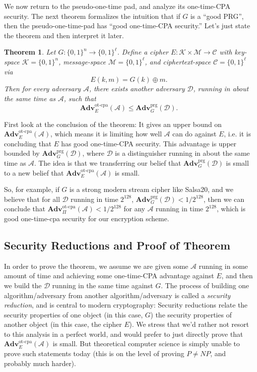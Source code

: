 \documentclass[11pt]{article}
\newtheorem{theorem}{Theorem}
\newcommand{\msgs}{\mathcal{M}}
\newcommand{\ctxts}{\mathcal{C}}
\newcommand{\keys}{\mathcal{K}}
\newcommand{\calD}{\mathcal{D}}
\newcommand{\calA}{\mathcal{A}}
\newcommand{\Adv}{\mathbf{Adv}}
\newcommand{\AdvPRG}[2]{\Adv^{\mathrm{prg}}_{#1}({#2})}
\newcommand{\bits}{\{0,1\}}
\newcommand{\AdvOTCPA}[2]{\Adv^{\mathrm{ot\mbox{-}cpa}}_{#1}({#2})}
\begin{document}
We now return to the pseudo-one-time pad, and analyze its one-time-CPA
security.
The next theorem formalizes the intuition that if $G$ is a ``good PRG'',
then the pseudo-one-time-pad has ``good one-time-CPA security.''
Let's just state the theorem and then interpret it later.
\begin{theorem}
    Let $G : \bits^n \to \bits^\ell$. Define a cipher
    $E:\keys\times\msgs\to\ctxts$ with key-space $\keys=\bits^n$,
    message-space $\msgs=\bits^\ell$, and ciphertext-space $\ctxts=\bits^\ell$
    via
    \[
        E(k,m) = G(k)\oplus m.
    \]
    Then for every adversary $\calA$, there exists another adversary $\calD$,
    running in about the same time as $\calA$, such that
    \[
        \AdvOTCPA{E}{\calA} \leq \AdvPRG{G}{\calD}.
    \]
\end{theorem}
First look at the conclusion of the theorem: It gives an upper bound on
$\AdvOTCPA{E}{\calA}$, which means it is limiting how well $\calA$ can do
against $E$, i.e. it is concluding that $E$ has good one-time-CPA security.
This advantage is upper bounded by $\AdvPRG{G}{\calD}$, where $\calD$ is a
distinguisher running in about the same time as $\calA$.
The idea is that we transferring our belief that  $\AdvPRG{G}{\calD}$
is small to a new belief that $\AdvOTCPA{E}{\calA}$ is small.

So, for example, if $G$ is a strong modern stream cipher like Salsa20, and we
believe that for all $\calD$ running in time $2^{128}$,
$\AdvPRG{G}{\calD}<1/2^{128}$, then we can conclude that $\AdvOTCPA{\Pi}{\calA}
<1/2^{128}$ for any $\calA$ running in time $2^{128}$, which is good
one-time-cpa security for our encryption scheme.


\subsection{Security Reductions and Proof of Theorem}

In order to prove the theorem, we assume we are given some $\calA$ running in
some amount of time and achieving some one-time-CPA advantage against $E$, and
then we build the $\calD$ running in the same time against $G$. The process of
building one algorithm/adversary from another algorithm/adversary is called a
\emph{security reduction}, and is central to modern cryptography: Security
reductions relate the security properties of one object (in this case, $G$) the
security properties of another object (in this case, the cipher $E$). We stress
that we'd rather not resort to this analysis in a perfect world, and would
prefer to just
directly prove that $\AdvOTCPA{E}{\calA}$ is small. But theoretical computer
science is simply unable to prove such statements today (this is on the level
of proving $P\neq NP$, and probably much harder).
\end{document}
